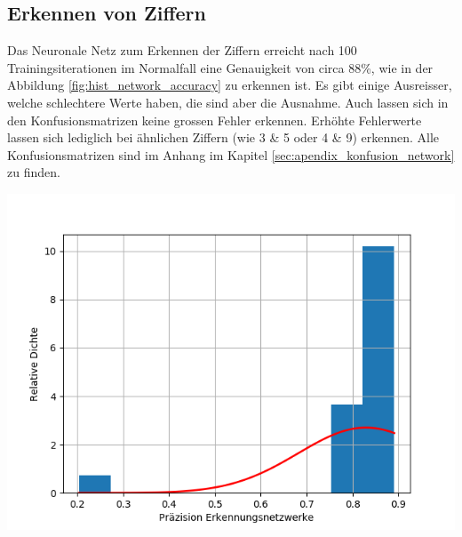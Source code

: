 \documentclass[Interploate_hadwritten_Digits.tex]{subfiles}
\begin{document}
	\subsection{Erkennen von Ziffern}
	\label{sec:results_classification}
	Das Neuronale Netz zum Erkennen der Ziffern erreicht nach 100 Trainingsiterationen im Normalfall eine Genauigkeit von circa 88\%, wie in der Abbildung \ref{fig:hist_network_accuracy} zu erkennen ist. Es gibt einige Ausreisser, welche schlechtere Werte haben, die sind aber die Ausnahme. Auch lassen sich in den Konfusionsmatrizen keine grossen Fehler erkennen. Erhöhte Fehlerwerte lassen sich lediglich bei ähnlichen Ziffern (wie 3 \& 5 oder 4 \& 9) erkennen. Alle Konfusionsmatrizen sind im Anhang im Kapitel \ref{sec:apendix_konfusion_network} zu finden.
	\begin{Figure}
		\centering
		\includegraphics[width=\linewidth]{img/results/histogram_network_accuracy.png}
		\label{fig:hist_network_accuracy}
	\end{Figure}
\end{document}
